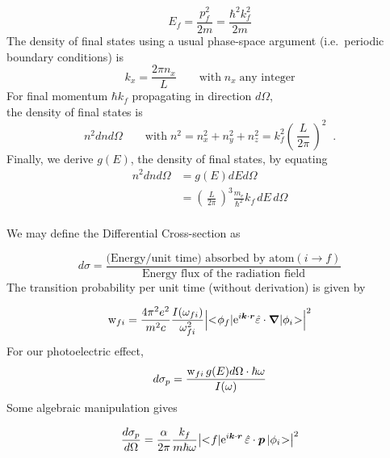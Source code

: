 \documentclass[graybox]{svmult}
\def\ket#1{{|#1\negmedspace>}}
\def\bra#1{{<\negmedspace#1|}}
\def\ltp{\left ( \,}
\def\rtp{\, \right  ) }
\def\rme{{\rm e}}
\def\rmikr{{\rm e}^{i \vec k \cdot \vec r}}
\def\eng{\varepsilon}
\begin{document}
\begin{equation}
E_f = \frac{p_f^2}{2m} = \frac{\hbar^2 k_f^2}{2m}
\end{equation}
The density of final states using
a usual phase-space argument (i.e.\ periodic boundary conditions) is
\begin{equation}
k_x = \frac{2\pi n_x}{L} \quad\quad \text{with} \; n_x \; 
\text{any integer}
\end{equation}
For final momentum $\hbar k_f$ propagating in direction $d\Omega$, \\
the density of final states is
\begin{equation}
n^2 dn d\Omega \quad\quad \text{with} \; n^2 = n_x^2 + n_y^2 + n_z^2 =
k_f^2 \ltp \frac{L}{2\pi} \rtp^2 \;\; .
\end{equation}
Finally, we derive $g(E)$, the density of final states, by
equating
\begin{equation}
\begin{split}
	n^2 dn d\Omega &= g(E) dE d\Omega \\
	               &= \ltp \frac{L}{2\pi} \rtp^3 \frac{m_e}{\hbar^2} k_f 
		         \, dE \, d\Omega\\
\end{split}
\end{equation}

We may  define the Differential Cross-section as

\begin{equation}
d\sigma = \frac{ \text{(Energy/unit time) absorbed by atom} (i \to f)}{
 \text{Energy flux of the radiation field}}
\end{equation}
The	transition probability per unit time (without derivation)
is given by

\begin{equation}
	{\rm w}_{fi} = 
	\frac{4 \pi^2 e^2}{m^2 c} 
	  \frac{I(\omega_{fi})}{\omega_{fi}^2} 
	  \Big| \bra{\phi_f} \rmikr \hat\eng \cdot \vec\nabla \ket{\phi_i} \Big|^2
\end{equation}
For our photoelectric effect,
\begin{equation}
	d\sigma_p = \frac{{\rm w}_{fi} \, g(E) 
	                  d\Omega \cdot \hbar\omega}{I(\omega)}
\end{equation}
Some algebraic manipulation gives

\begin{equation}
	\frac{d\sigma_p}{d\Omega} = \frac{\alpha}{2\pi} 
	     \frac{k_f}{m\hbar\omega} 
	\big | \bra{f} \rme^{i \vec k \cdot \vec r} \, \hat\eng \cdot \vec p \,
	  \ket{\phi_i} \big|^2
\end{equation}
\end{document}
